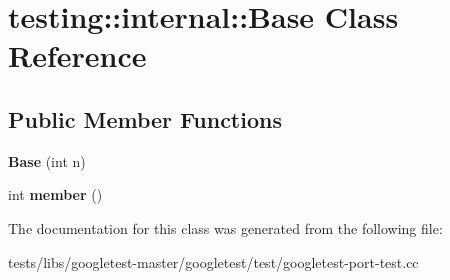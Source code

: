 \hypertarget{classtesting_1_1internal_1_1Base}{}\section{testing\+:\+:internal\+:\+:Base Class Reference}
\label{classtesting_1_1internal_1_1Base}
\subsection*{Public Member Functions}
\begin{DoxyCompactItemize}
\item 
\mbox{\label{classtesting_1_1internal_1_1Base_a255d105410a1eeb5f4690c9c8cd8e104}} 
{\bfseries Base} (int n)
\item 
\mbox{\label{classtesting_1_1internal_1_1Base_a7ddba6221b56613be545544b7ef6214c}} 
int {\bfseries member} ()
\end{DoxyCompactItemize}


The documentation for this class was generated from the following file\+:\begin{DoxyCompactItemize}
\item 
tests/libs/googletest-\/master/googletest/test/googletest-\/port-\/test.\+cc\end{DoxyCompactItemize}
